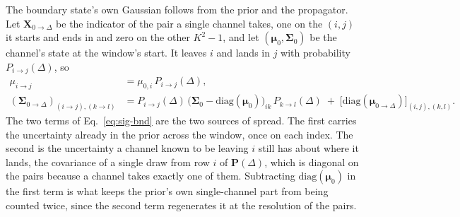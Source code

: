 \begin{appendixbox}
The boundary state's own Gaussian follows from the prior and the propagator. Let
$\mathbf{X}_{0\to\Delta}$ be the indicator of the pair a single channel takes, one on the
$(i,j)$ it starts and ends in and zero on the other $K^2-1$, and let
$(\bm{\mu}_0,\bm{\Sigma}_0)$ be the channel's state at the window's start. It leaves $i$ and
lands in $j$ with probability $P_{i\to j}(\Delta)$, so
\begin{align}
  \mu_{i\to j} &= \mu_{0,i}\,P_{i\to j}(\Delta), \label{eq:mu-bnd}\\
  (\bm{\Sigma}_{0\to\Delta})_{(i\to j),(k\to l)} &=
    P_{i\to j}(\Delta)\,\bigl(\bm{\Sigma}_0-\mathrm{diag}(\bm{\mu}_0)\bigr)_{i k}\,
    P_{k\to l}(\Delta)
    \;+\; \bigl[\mathrm{diag}(\bm{\mu}_{0\to\Delta})\bigr]_{(i,j),(k,l)}.
  \label{eq:sig-bnd}
\end{align}
The two terms of Eq.~\ref{eq:sig-bnd} are the two sources of spread. The first carries the
uncertainty already in the prior across the window, once on each index. The second is the
uncertainty a channel known to be leaving $i$ still has about where it lands, the covariance
of a single draw from row $i$ of $\mathbf{P}(\Delta)$, which is diagonal on the pairs
because a channel takes exactly one of them. Subtracting $\mathrm{diag}(\bm{\mu}_0)$ in the
first term is what keeps the prior's own single-channel part from being counted twice, since
the second term regenerates it at the resolution of the pairs.


\end{appendixbox}
